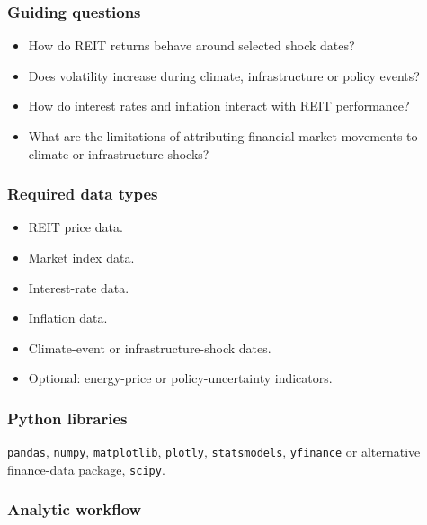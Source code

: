 \documentclass[
  a4paper,
]{article}
\providecommand{\tightlist}{%
  \setlength{\itemsep}{0pt}\setlength{\parskip}{0pt}}
\begin{document}
\subsubsection{Guiding questions}\label{guiding-questions-2}

\begin{itemize}
\tightlist
\item
  How do REIT returns behave around selected shock dates?
\item
  Does volatility increase during climate, infrastructure or policy
  events?
\item
  How do interest rates and inflation interact with REIT performance?
\item
  What are the limitations of attributing financial-market movements to
  climate or infrastructure shocks?
\end{itemize}

\subsubsection{Required data types}\label{required-data-types-2}

\begin{itemize}
\tightlist
\item
  REIT price data.
\item
  Market index data.
\item
  Interest-rate data.
\item
  Inflation data.
\item
  Climate-event or infrastructure-shock dates.
\item
  Optional: energy-price or policy-uncertainty indicators.
\end{itemize}

\subsubsection{Python libraries}\label{python-libraries-2}

\texttt{pandas}, \texttt{numpy}, \texttt{matplotlib}, \texttt{plotly},
\texttt{statsmodels}, \texttt{yfinance} or alternative finance-data
package, \texttt{scipy}.

\subsubsection{Analytic workflow}\label{analytic-workflow-2}
\end{document}
